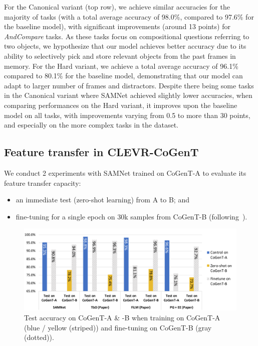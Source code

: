 For the Canonical variant (top row), we achieve similar accuracies for the majority of tasks (with a total average accuracy of 98.0\%, compared to 97.6\% for the baseline model), with significant improvements (around 13 points) for \textit{AndCompare} tasks.
As these tasks focus on compositional questions referring to two objects, we hypothesize that our model achieves better accuracy due to its ability to selectively pick and store relevant objects from the past frames in memory.
For the Hard variant, we achieve a total average accuracy of 96.1\% compared to 80.1\% for the baseline model, demonstrating that our model can adapt to larger number of frames and distractors.
Despite there being some tasks in the Canonical variant where SAMNet achieved slightly lower accuracies, when comparing performances on the Hard variant, it improves upon the baseline model on all tasks, with improvements varying from 0.5 to more than 30 points, and especially on the more complex tasks in the dataset.


\subsection{Feature transfer in CLEVR-CoGenT}
\label{sec:feature}


We conduct 2 experiments with SAMNet trained on CoGenT-A to evaluate its feature transfer capacity:
\begin{itemize}
\compresslist
\item an immediate test (zero-shot learning) from A to B; and
\item fine-tuning for a single epoch on 30k samples from CoGenT-B (following~\cite{johnson2017inferring, mascharka2018transparency, perez2018film, marois2018transfer}).
\end{itemize}

\begin{figure}[htbp]
	\centering
	\includegraphics[width=\columnwidth]{../results/CoGenT_B_results_with_baselines.pdf}
	\caption{Test accuracy on CoGenT-A \& -B when training on CoGenT-A (blue / yellow (striped)) and fine-tuning on CoGenT-B (gray (dotted)).}
	\label{fig:CoGenT-B-results}
\end{figure}

